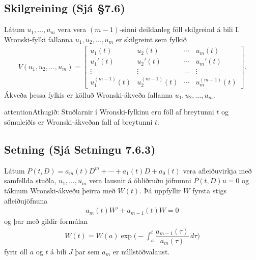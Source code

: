 \documentclass[a4paper,10pt,icelandic]{sphinxmanual}
\begin{document}
\subsection{Skilgreining (Sjá \S{}7.6)}
\label{\detokenize{Kafli07:skilgreining-sja-7-6}}
Látum \(u_1, \ldots, u_m\) vera vera \((m-1)\)-sinni deildanleg föll skilgreind á bili I. Wronski-fylki fallanna \(u_1, u_2, \ldots, u_m\) er skilgreint sem fylkið
\begin{equation*}
\begin{split}V(u_1, u_2, \ldots, u_m)=\begin{bmatrix}
u_1(t)&u_2(t)&\cdots&u_m(t)\\
u_1'(t)&u_2'(t)&\cdots&u_m'(t)\\
\vdots&\vdots&\dots&\vdots\\
u_1^{(m-1)}(t)&u_2^{(m-1)}(t)&\cdots&u_m^{(m-1)}(t)
\end{bmatrix}.\end{split}
\end{equation*}
Ákveða þessa fylkis er kölluð Wronski-ákveða fallanna \(u_1, u_2, \ldots, u_m\).

\begin{sphinxadmonition}{attention}{Athugið:}
Stuðlarnir í Wronski-fylkinu eru föll af breytunni \(t\) og sömuleiðis er Wronski-ákveðan fall af breytunni \(t\).
\end{sphinxadmonition}


\subsection{Setning (Sjá Setningu 7.6.3)}
\label{\detokenize{Kafli07:setning-sja-setningu-7-6-3}}
Látum \(P(t,D)=a_m(t)D^m+\cdots+a_1(t)D+a_0(t)\) vera afleiðuvirkja með samfellda stuðla, \(u_1,\dots,u_m\) vera lausnir á óhliðruðu jöfnunni \(P(t,D)u=0\) og táknum Wronski-ákveðu þeirra með \(W(t)\). Þá uppfyllir \(W\) fyrsta stigs afleiðujöfnuna
\begin{equation*}
\begin{split}a_m(t) W'+a_{m-1}(t)W=0\end{split}
\end{equation*}
og þar með gildir formúlan
\begin{equation*}
\begin{split}W(t)=W(a)\exp\bigg(-\int_a^t\dfrac{a_{m-1}(\tau)}{a_m(\tau)}\,
d\tau\bigg)\end{split}
\end{equation*}
fyrir öll \(a\) og \(t\) á bili \(J\) þar sem \(a_m\) er núllstöðvalaust.
\end{document}

